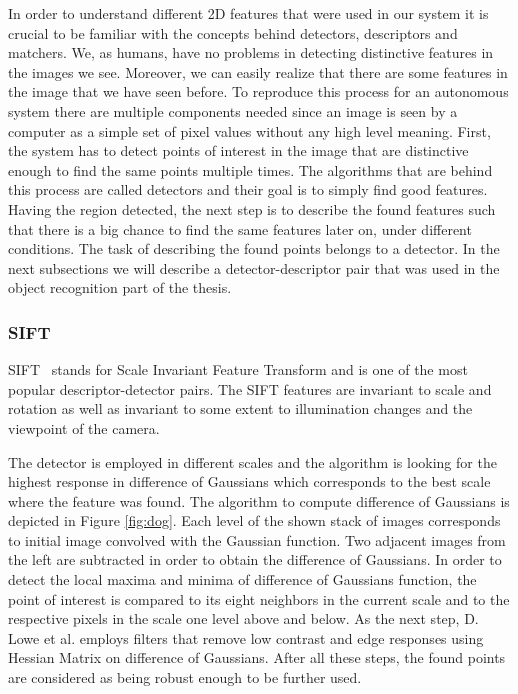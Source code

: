 In order to understand different 2D features that were used in our system it is crucial to be familiar with the concepts behind detectors, descriptors and matchers. We, as humans, have no problems in detecting distinctive features in the images we see. Moreover, we can easily realize that there are some features in the image that we have seen before. To reproduce this process for an autonomous system there are multiple components needed since an image is seen by a computer as a simple set of pixel values without any high level meaning. First, the system has to detect points of interest in the image that are distinctive enough to find the same points multiple times. The algorithms that are behind this process are called detectors and their goal is to simply find good features. Having the region detected, the next step is to describe the found features such that there is a big chance to find the same features later on, under different conditions. The task of describing the found points belongs to a detector. In the next subsections we will describe a detector-descriptor pair that was used in the object recognition part of the thesis.

\subsubsection{SIFT}
SIFT~\cite{lowe2004distinctive} stands for Scale Invariant Feature Transform and is one of the most popular descriptor-detector pairs. The SIFT features are invariant to scale and rotation as well as invariant to some extent to illumination changes and the viewpoint of the camera.  

The detector is employed in different scales and the algorithm is looking for the highest response in difference of Gaussians which corresponds to the best scale where the feature was found. The algorithm to compute difference of Gaussians is depicted in Figure \ref{fig:dog}. Each level of the shown stack of images corresponds to initial image convolved with the Gaussian function. Two adjacent images from the left are subtracted in order to obtain the difference of Gaussians. In order to detect the local maxima and minima of difference of Gaussians function, the point of interest is compared to its eight neighbors in the current scale and to the respective pixels in the scale one level above and below. As the next step, D. Lowe et al. employs filters that remove low contrast and edge responses using Hessian Matrix on difference of Gaussians. After all these steps, the found points are considered as being robust enough to be further used.

